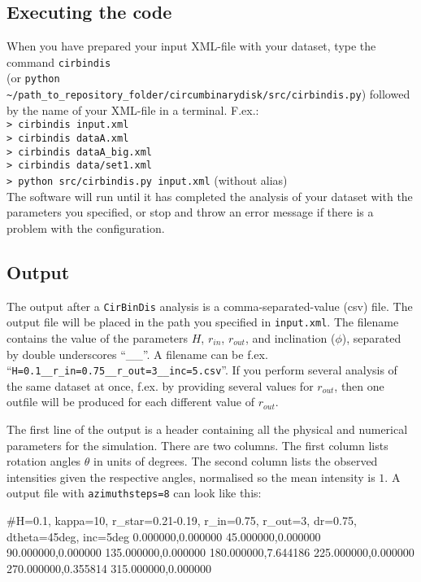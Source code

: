 \documentclass[a4paper, 12pt, english, titlepage]{article}
\newcommand{\sname}{\texttt{CirBinDis}\xspace}
\begin{document}
\subsection{Executing the code}
    When you have prepared your input XML-file with your dataset, type the command \texttt{cirbindis} \\
    (or \texttt{python \textasciitilde/path\_to\_repository\_folder/circumbinarydisk/src/cirbindis.py})
    followed by the name of your XML-file in a terminal.
    F.ex.: \\
    \texttt{> cirbindis input.xml} \\
    \texttt{> cirbindis dataA.xml} \\
    \texttt{> cirbindis dataA\_big.xml} \\
    \texttt{> cirbindis data/set1.xml} \\
    \texttt{> python src/cirbindis.py input.xml} (without alias) \\
    The software will run until it has completed the analysis of your dataset with the parameters you specified, or stop and throw an error message if there is a problem with the configuration.

\subsection{Output}
    The output after a \sname analysis is a comma-separated-value (csv) file. The output file will be placed in the path you specified in \texttt{input.xml}. The filename contains the value of the parameters $H$, $r_{in}$, $r_{out}$, and inclination ($\phi$), separated by double underscores ``\_\_''. A filename can be f.ex.
    ``\texttt{H=0.1\_\_r\_in=0.75\_\_r\_out=3\_\_inc=5.csv}''.
    If you perform several analysis of the same dataset at once, f.ex. by providing several values for $r_{out}$, then one outfile will be produced for each different value of $r_{out}$.

    The first line of the output is a header containing all the physical and numerical parameters for the simulation. There are two columns. The first column lists rotation angles $\theta$ in units of degrees. The second column lists the observed intensities given the respective angles, normalised so the mean intensity is $1$. A output file with \texttt{azimuthsteps=8} can look like this:
\begin{verbatim*}
#H=0.1, kappa=10, r_star=0.21-0.19, r_in=0.75, r_out=3, dr=0.75,
dtheta=45deg, inc=5deg
0.000000,0.000000
45.000000,0.000000
90.000000,0.000000
135.000000,0.000000
180.000000,7.644186
225.000000,0.000000
270.000000,0.355814
315.000000,0.000000
\end{verbatim*}
\end{document}
